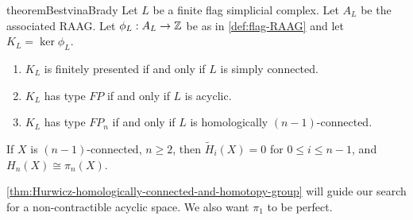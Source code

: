 \begin{restatable}{theorem}{BestvinaBrady}
    \label{thm:Bestvina-Brady-finiteness-of-flag-RAAG}
    Let \(L\) be a finite flag simplicial complex. Let \(A_L\) be the associated RAAG. Let \(\phi_L : A_L \to \mathbb{Z}\) be as in \cref{def:flag-RAAG} and let \(K_L = \ker \phi_L\).
    \begin{enumerate}
        \item \(K_L\) is finitely presented if and only if \(L\) is simply connected.
        \item \(K_L\) has type \(FP\) if and only if \(L\) is acyclic.
        \item \(K_L\) has type \(FP_n\) if and only if \(L\) is homologically \((n-1)\)-connected.
    \end{enumerate} 
\end{restatable}


\begin{theorem}
    \label{thm:Hurwicz-homologically-connected-and-homotopy-group}
    If \(X\) is \((n-1)\)-connected, \(n\geq 2\), then \(\tilde H_i (X)= 0\) for \(0\leq i \leq n-1\), and \(H_n(X) \cong \pi_n(X)\).
\end{theorem}



\cref{thm:Hurwicz-homologically-connected-and-homotopy-group} will guide our search for a non-contractible acyclic space. We also want \(\pi_1 \) to be perfect.

